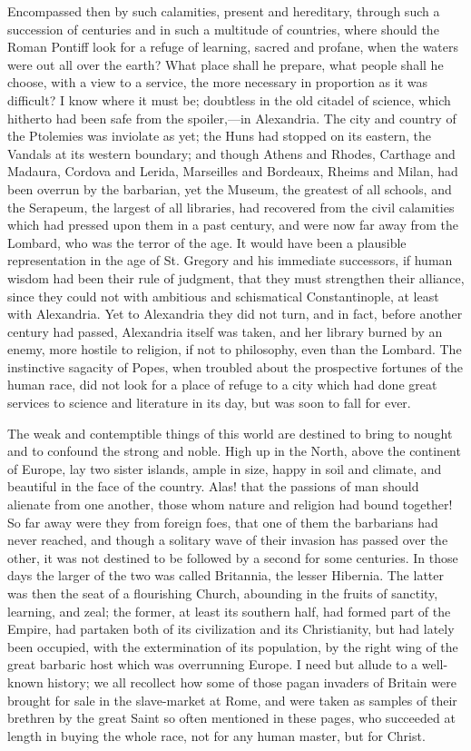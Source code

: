 Encompassed then by such calamities, present and hereditary,
through such a succession of centuries and in such a multitude of
countries, where should the Roman Pontiff look for a refuge of
learning, sacred and profane, when the waters were out all over the
earth? What place shall he prepare, what people shall he choose, with
a view to a service, the more necessary in proportion as it was
difficult? I know where it must be; doubtless in the old citadel of
science, which hitherto had been safe from the spoiler,—in
Alexandria. The city and country of the Ptolemies was inviolate as
yet; the Huns had stopped on its eastern, the Vandals at its western
boundary; and though Athens and Rhodes, Carthage and Madaura, Cordova
and Lerida, Marseilles and Bordeaux, Rheims and Milan, had been
overrun by the barbarian, yet the Museum, the greatest of all schools,
and the Serapeum, the largest of all libraries, had recovered from the
civil calamities which had pressed upon them in a past century,
and were now far away from the Lombard, who was the terror of the age.
It would have been a plausible representation in the age of St.
Gregory and his immediate successors, if human wisdom had been their
rule of judgment, that they must strengthen their alliance, since they
could not with ambitious and schismatical Constantinople, at least
with Alexandria. Yet to Alexandria they did not turn, and in fact,
before another century had passed, Alexandria itself was taken, and
her library burned by an enemy, more hostile to religion, if not to
philosophy, even than the Lombard. The instinctive sagacity of Popes,
when troubled about the prospective fortunes of the human race, did
not look for a place of refuge to a city which had done great services
to science and literature in its day, but was soon to fall for ever.

The weak and contemptible things of this world are destined to
bring to nought and to confound the strong and noble. High up in the
North, above the continent of Europe, lay two sister islands, ample in
size, happy in soil and climate, and beautiful in the face of the
country. Alas! that the passions of man should alienate from one
another, those whom nature and religion had bound together! So far
away were they from foreign foes, that one of them the barbarians had
never reached, and though a solitary wave of their invasion has passed
over the other, it was not destined to be followed by a second for
some centuries. In those days the larger of the two was called
Britannia, the lesser Hibernia. The latter was then the seat of a
flourishing Church, abounding in the fruits of sanctity, learning, and
zeal; the former, at least its southern half, had formed part of the
Empire, had partaken both of its civilization and its Christianity,
but had lately been occupied, with the extermination of its
population, by the right wing of the great barbaric host which was
overrunning Europe. I need but allude to a well-known history; we all
recollect how some of those pagan invaders of Britain were brought for
sale in the slave-market at Rome, and were taken as samples of their
brethren by the great Saint so often mentioned in these pages, who
succeeded at length in buying the whole race, not for any human
master, but for Christ.

